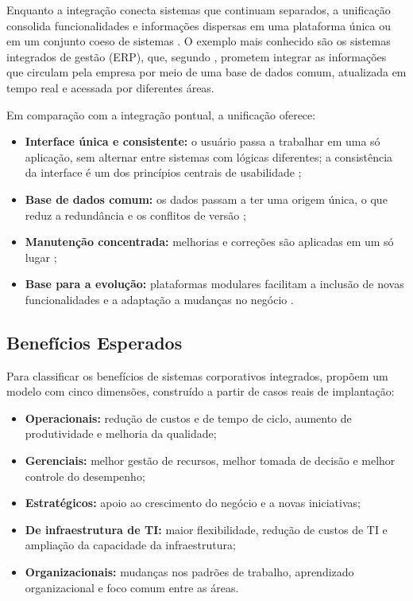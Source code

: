 Enquanto a integração conecta sistemas que continuam separados, a unificação consolida funcionalidades e informações dispersas em uma plataforma única ou em um conjunto coeso de sistemas \citep{laudon2020}. O exemplo mais conhecido são os sistemas integrados de gestão (ERP), que, segundo \citet{davenport1998}, prometem integrar as informações que circulam pela empresa por meio de uma base de dados comum, atualizada em tempo real e acessada por diferentes áreas.

Em comparação com a integração pontual, a unificação oferece:

\begin{itemize}
    \item \textbf{Interface única e consistente:} o usuário passa a trabalhar em uma só aplicação, sem alternar entre sistemas com lógicas diferentes; a consistência da interface é um dos princípios centrais de usabilidade \citep{nielsen1993,norman2013};
    \item \textbf{Base de dados comum:} os dados passam a ter uma origem única, o que reduz a redundância e os conflitos de versão \citep{elmasri2016};
    \item \textbf{Manutenção concentrada:} melhorias e correções são aplicadas em um só lugar \citep{pressman2016};
    \item \textbf{Base para a evolução:} plataformas modulares facilitam a inclusão de novas funcionalidades e a adaptação a mudanças no negócio \citep{ross2006}.
\end{itemize}

\subsection{Benefícios Esperados}

Para classificar os benefícios de sistemas corporativos integrados, \citet{shang2002} propõem um modelo com cinco dimensões, construído a partir de casos reais de implantação:

\begin{itemize}
    \item \textbf{Operacionais:} redução de custos e de tempo de ciclo, aumento de produtividade e melhoria da qualidade;
    \item \textbf{Gerenciais:} melhor gestão de recursos, melhor tomada de decisão e melhor controle do desempenho;
    \item \textbf{Estratégicos:} apoio ao crescimento do negócio e a novas iniciativas;
    \item \textbf{De infraestrutura de TI:} maior flexibilidade, redução de custos de TI e ampliação da capacidade da infraestrutura;
    \item \textbf{Organizacionais:} mudanças nos padrões de trabalho, aprendizado organizacional e foco comum entre as áreas.
\end{itemize}

